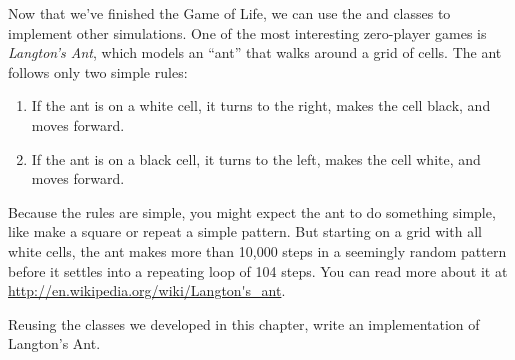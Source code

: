 \begin{exercise}

Now that we've finished the Game of Life, we can use the  and  classes to implement other simulations.
One of the most interesting zero-player games is {\it Langton's Ant}, which models an ``ant'' that walks around a grid of cells.
The ant follows only two simple rules:

\begin{enumerate}
\item If the ant is on a white cell, it turns to the right, makes the cell black, and moves forward.
\item If the ant is on a black cell, it turns to the left, makes the cell white, and moves forward.
\end{enumerate}

Because the rules are simple, you might expect the ant to do something simple, like make a square or repeat a simple pattern.
But starting on a grid with all white cells, the ant makes more than 10,000 steps in a seemingly random pattern before it settles into a repeating loop of 104 steps.
You can read more about it at \url{http://en.wikipedia.org/wiki/Langton's_ant}.

Reusing the classes we developed in this chapter, write an implementation of Langton's Ant.

\end{exercise}
